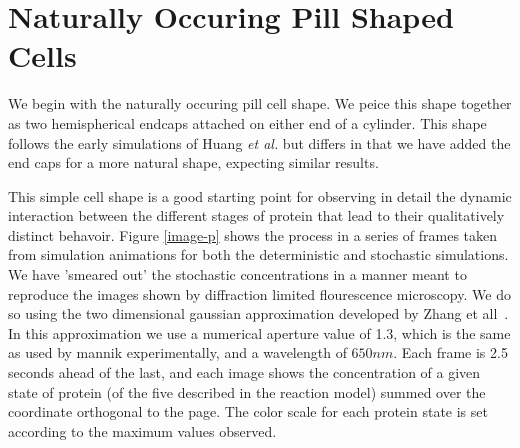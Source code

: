 \documentclass[letterpaper,twocolumn,amsmath,amssymb,pre]{revtex4-1}
\begin{document}
\section{Naturally Occuring Pill Shaped Cells}

We begin with the naturally occuring pill cell shape.  We peice this
shape together as two hemispherical endcaps attached on either end of
a cylinder.  This shape follows the early simulations of Huang
\emph{et al.} but differs in that we have added the end caps for a
more natural shape, expecting similar results.

This simple cell shape is a good starting point for observing in
detail the dynamic interaction between the different stages of protein
that lead to their qualitatively distinct behavoir. Figure
\ref{image-p} shows the process in a series of frames taken from
simulation animations for both the deterministic and stochastic
simulations.  We have 'smeared out' the stochastic concentrations in a
manner meant to reproduce the images shown by diffraction limited
flourescence microscopy.  We do so using the two dimensional gaussian
approximation developed by Zhang et all~\cite{zhang2007gaussian}.  In
this approximation we use a numerical aperture value of 1.3, which is
the same as used by mannik experimentally, and a wavelength of
$650nm$.  Each frame is 2.5 seconds ahead of the last, and each image
shows the concentration of a given state of protein (of the five
described in the reaction model) summed over the coordinate orthogonal
to the page.  The color scale for each protein state is set according
to the maximum values observed.
\end{document}
